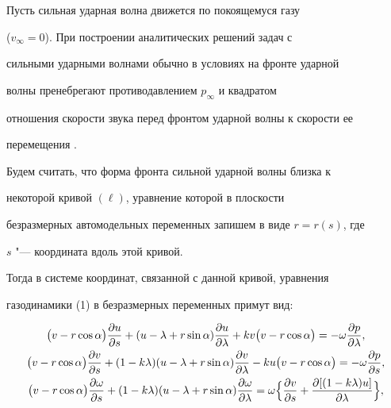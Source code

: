 Пусть сильная ударная волна движется по покоящемуся газу


($v_\infty = 0$). При построении аналитических решений задач с


сильными ударными волнами обычно в условиях на фронте ударной


волны пренебрегают противодавлением $p_\infty$ и квадратом


отношения скорости звука перед фронтом ударной волны к скорости ее


перемещения \cite{Sedov}.





Будем считать,  что форма фронта сильной ударной волны близка к


некоторой кривой $(\ell)$,  уравнение которой в плоскости


безразмерных автомодельных переменных запишем в виде $r=r(s)$,  где


$s$ "--- координата вдоль этой кривой.





Тогда в системе координат,  связанной с данной кривой, уравнения


газодинамики (1) в безразмерных переменных примут вид:


\begin{gather}


\bigl(v - r\cos\alpha\bigr) \frac{\partial u}{\partial


s} + (u - \lambda +  r\sin\alpha) \frac{\partial


u}{\partial \lambda} + k v \bigl(v - r


\cos\alpha\bigr) = - \omega \frac{\partial p}{\partial


\lambda},\\


\bigl(v-r\cos\alpha\bigr)\frac {\partial v}{\partial


s}+(1-k\lambda)(u-\lambda+r\sin\alpha)\frac {\partial v}{\partial


\lambda}-ku\bigl(v-r\cos\alpha\bigr)=-\omega\frac{\partial


p}{\partial s},\\


\bigl(v-r\cos\alpha\bigr)\frac{\partial\omega}{\partial


s}+(1-k\lambda)(u-\lambda+


r\sin\alpha) \frac{\partial\omega}{\partial\lambda} =\omega \Bigl\{


\frac{\partial v}{\partial s} + {\partial


[(1-k\lambda)u]\over\partial\lambda}\Bigr\},


\end{gather}


